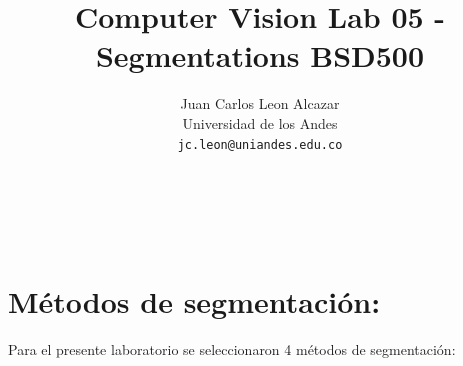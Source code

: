 \documentclass[10pt,twocolumn,letterpaper]{article}
\begin{document}
\title{Computer Vision Lab 05 -Segmentations BSD500}

\author{Juan Carlos Leon Alcazar\\
Universidad de los Andes\\
{\tt\small jc.leon@uniandes.edu.co}
\and
\\
\\
\\
{\tt\small }
}

\maketitle

\begin{abstract}
 
\end{abstract}

\section{Métodos de segmentación:}
Para  el presente laboratorio se seleccionaron 4 métodos de segmentación:
\end{document}
